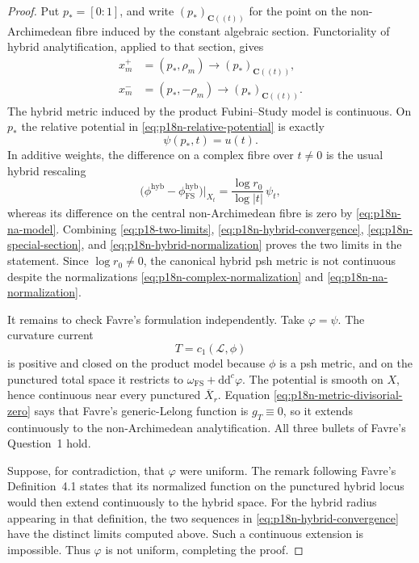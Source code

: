 \begin{proof}
Put \(p_*=[0:1]\), and write \((p_*)_{\mathbf C((t))}\) for the point
on the non-Archimedean fibre induced by the constant algebraic section.
Functoriality of hybrid analytification, applied to that section, gives
\[
\begin{aligned}
 x_m^+&=(p_*,\rho_m)\longrightarrow(p_*)_{\mathbf C((t))},\\
 x_m^-&=(p_*,-\rho_m)\longrightarrow(p_*)_{\mathbf C((t))}.
\end{aligned}
\tag{21}\label{eq:p18n-hybrid-convergence}
\]
The hybrid metric induced by the product Fubini--Study model is
continuous.  On \(p_*\) the relative potential in
\eqref{eq:p18n-relative-potential} is exactly
\[
                         \psi(p_*,t)=u(t).
\tag{22}\label{eq:p18n-special-section}
\]
In additive weights, the difference on a complex fibre over \(t\ne0\)
is the usual hybrid rescaling
\[
 \bigl(\phi^{\mathrm{hyb}}
       -\phi_{\mathrm{FS}}^{\mathrm{hyb}}\bigr)|_{X_t}
 =\frac{\log r_0}{\log|t|}\,\psi_t,
\tag{23}\label{eq:p18n-hybrid-normalization}
\]
whereas its difference on the central non-Archimedean fibre is zero by
\eqref{eq:p18n-na-model}.  Combining
\eqref{eq:p18-two-limits}, \eqref{eq:p18n-hybrid-convergence},
\eqref{eq:p18n-special-section}, and
\eqref{eq:p18n-hybrid-normalization} proves the two limits in the
statement.  Since \(\log r_0\ne0\), the canonical hybrid psh metric is
not continuous despite the normalizations
\eqref{eq:p18n-complex-normalization} and
\eqref{eq:p18n-na-normalization}.

It remains to check Favre's formulation independently.  Take
\(\varphi=\psi\).  The curvature current
\[
                         T=c_1(\mathcal L,\phi)
\tag{24}\label{eq:p18n-favre-current}
\]
is positive and closed on the product model because \(\phi\) is a psh
metric, and on the punctured total space it restricts to
\(\omega_{\mathrm{FS}}+\mathrm d\mathrm d^c\varphi\).  The potential
is smooth on \(X\), hence continuous near every punctured
\(\overline X_r\).  Equation \eqref{eq:p18n-metric-divisorial-zero}
says that Favre's generic-Lelong function is \(g_T\equiv0\), so it
extends continuously to the non-Archimedean analytification.  All three
bullets of Favre's Question~1 hold.

Suppose, for contradiction, that \(\varphi\) were uniform.  The remark
following Favre's Definition~4.1 states that its normalized function on
the punctured hybrid locus would then extend continuously to the hybrid
space.  For the hybrid radius appearing in that definition, the two
sequences in \eqref{eq:p18n-hybrid-convergence} have the distinct limits
computed above.  Such a continuous extension is impossible.  Thus
\(\varphi\) is not uniform, completing the proof.
\end{proof}
